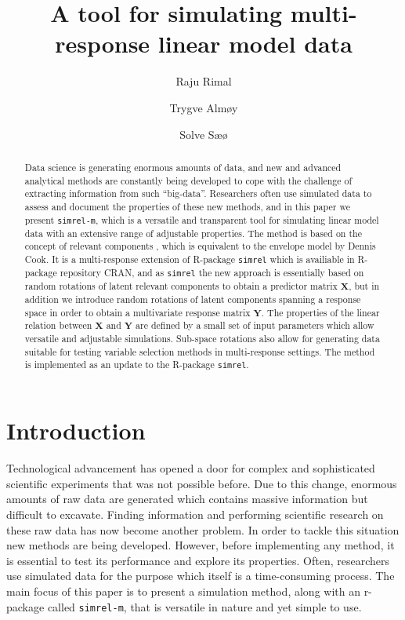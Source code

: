 \documentclass[num-refs]{wiley-article}
\title{A tool for simulating multi-response linear model data}
\author[1]{Raju Rimal}
\affil[1]{Faculty of Chemistry and Bioinformatics, Norwegian University of Life
Sciences, \AA s, Norway}
\author[1]{Trygve Alm\o y}
\author[2]{Solve S\ae \o}
\affil[2]{Prorector, Norwegian University of Life Sciences, \AA s, Norway}
\begin{document}
\maketitle

\begin{abstract}
\small
Data science is generating enormous amounts of data, and new and
advanced analytical methods are constantly being developed to cope with
the challenge of extracting information from such ``big-data''.
Researchers often use simulated data to assess and document the
properties of these new methods, and in this paper we present
\texttt{simrel-m}, which is a versatile and transparent tool for
simulating linear model data with an extensive range of adjustable
properties. The method is based on the concept of relevant components
\citet{helland1994comparison}, which is equivalent to the envelope model
by Dennis Cook. It is a multi-response extension of R-package
\texttt{simrel} which is availiable in R-package repository CRAN, and as
\texttt{simrel} the new approach is essentially based on random
rotations of latent relevant components to obtain a predictor matrix
\(\mathbf{X}\), but in addition we introduce random rotations of latent
components spanning a response space in order to obtain a multivariate
response matrix \(\mathbf{Y}\). The properties of the linear relation
between \(\mathbf{X}\) and \(\mathbf{Y}\) are defined by a small set of
input parameters which allow versatile and adjustable simulations.
Sub-space rotations also allow for generating data suitable for testing
variable selection methods in multi-response settings. The method is
implemented as an update to the R-package \texttt{simrel}.
\end{abstract}

\section{Introduction}\label{introduction}

Technological advancement has opened a door for complex and
sophisticated scientific experiments that was not possible before. Due
to this change, enormous amounts of raw data are generated which
contains massive information but difficult to excavate. Finding
information and performing scientific research on these raw data has now
become another problem. In order to tackle this situation new methods
are being developed. However, before implementing any method, it is
essential to test its performance and explore its properties. Often,
researchers use simulated data for the purpose which itself is a
time-consuming process. The main focus of this paper is to present a
simulation method, along with an r-package called \texttt{simrel-m},
that is versatile in nature and yet simple to use.
\end{document}
